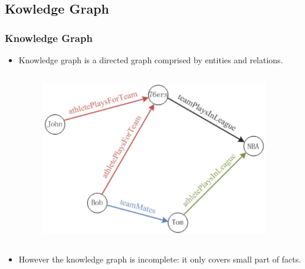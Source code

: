 \documentclass[pdf,10pt]{beamer}
\begin{document}
\subsection{Kowledge Graph}
\begin{frame}
\frametitle{Knowledge Graph}
\begin{itemize}
	\item Knowledge graph is a directed graph comprised by entities and relations. 

	\begin{columns}[onlytextwidth]
		\begin{column}{0.45\textwidth}
			\begin{figure}
				\includegraphics[width=.85\textwidth]{2.eps}
			\end{figure}
		\end{column}
		\begin{column}{0.45\textwidth}
			\begin{itemize}
			\end{itemize}
		\end{column}
	\end{columns}
	\item However the knowledge graph is incomplete: it only covers small part of facts.
	\end{itemize}
\end{frame}
\end{document}
